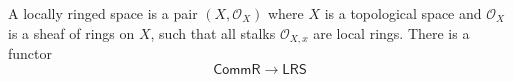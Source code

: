 A locally ringed space is a pair $(X, \mathcal{O}_X)$ where $X$ is a topological space and $\mathcal{O}_X$ is a sheaf of rings on $X$, such that all stalks $\mathcal{O}_{X,x}$ are local rings. There is a functor \[\mathsf{CommR} \longrightarrow \mathsf{LRS}\]
%
%
%
%
%
